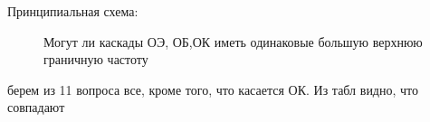 Принципиальная схема:
\begin{center}
        \begin{figure}[h!]
                \caption{Могут ли каскады ОЭ, ОБ,ОК иметь одинаковые большую верхнюю граничную частоту}
        \end{figure}
\end{center}

берем из 11 вопроса все, кроме того, что касается ОК. Из табл видно, что совпадают


